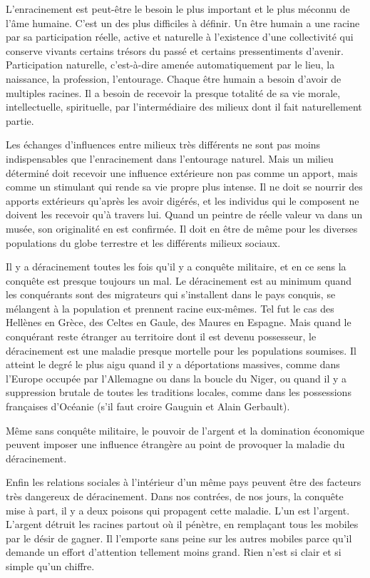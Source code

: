 \documentclass[french,twoside]{book} %
\begin{document}
\noindent \par
L'enracinement est peut-être le besoin le plus important et le plus méconnu de l'âme humaine. C'est un des plus difficiles à définir. Un être humain a une racine par sa participation réelle, active et naturelle à l'existence d'une collectivité qui conserve vivants certains trésors du passé et certains pressentiments d'avenir. Participation naturelle, c'est-à-dire amenée automatiquement par le lieu, la naissance, la profession, l'entourage. Chaque être humain a besoin d'avoir de multiples racines. Il a besoin de recevoir la presque totalité de sa vie morale, intellectuelle, spirituelle, par l'intermédiaire des milieux dont il fait naturellement partie.\par
Les échanges d'influences entre milieux très différents ne sont pas moins indispensables que l'enracinement dans l'entourage naturel. Mais un milieu déterminé doit recevoir une influence extérieure non pas comme un apport, mais comme un stimulant qui rende sa vie propre plus intense. Il ne doit se nourrir des apports extérieurs qu'après les avoir digérés, et les individus qui le composent ne doivent les recevoir qu'à travers lui. Quand un peintre de réelle valeur va dans un musée, son originalité en est confirmée. Il doit en être de même pour les diverses populations du globe terrestre et les différents milieux sociaux.\par
Il y a déracinement toutes les fois qu'il y a conquête militaire, et en ce sens la conquête est presque toujours un mal. Le déracinement est au minimum quand les conquérants sont des migrateurs qui s'installent dans le pays conquis, se mélangent à la population et prennent racine eux-mêmes. Tel fut le cas des Hellènes en Grèce, des Celtes en Gaule, des Maures en Espagne. Mais quand le conquérant reste étranger au territoire dont il est devenu possesseur, le déracinement est une maladie presque mortelle pour les populations soumises. Il atteint le degré le plus aigu quand il y a déportations massives, comme dans l'Europe occupée par l'Allemagne ou dans la boucle du Niger, ou quand il y a suppression brutale de toutes les traditions locales, comme dans les possessions françaises d'Océanie (s'il faut croire Gauguin et Alain Gerbault).\par
Même sans conquête militaire, le pouvoir de l'argent et la domination économique peuvent imposer une influence étrangère au point de provoquer la maladie du déracinement.\par
Enfin les relations sociales à l'intérieur d'un même pays peuvent être des facteurs très dangereux de déracinement. Dans nos contrées, de nos jours, la conquête mise à part, il y a deux poisons qui propagent cette maladie. L'un est l'argent. L'argent détruit les racines partout où il pénètre, en remplaçant tous les mobiles par le désir de gagner. Il l'emporte sans peine sur les autres mobiles parce qu'il demande un effort d'attention tellement moins grand. Rien n'est si clair et si simple qu'un chiffre.\par
\end{document}
